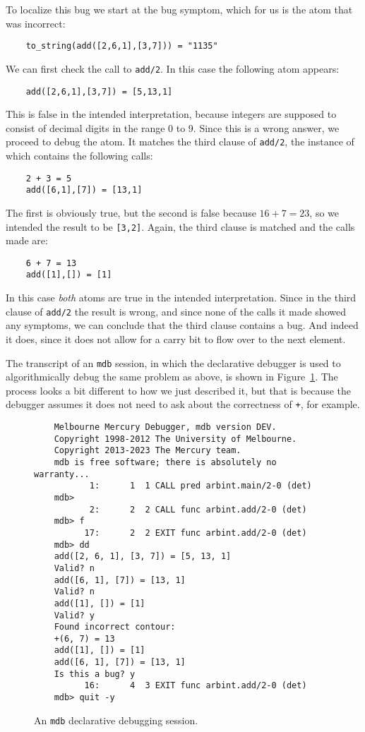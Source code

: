 To localize this bug we start at the bug symptom,
which for us is the atom that was incorrect:
\begin{verbatim}
    to_string(add([2,6,1],[3,7])) = "1135"
\end{verbatim}
We can first check the call to \texttt{add/2}.
In this case the following atom appears:
\begin{verbatim}
    add([2,6,1],[3,7]) = [5,13,1]
\end{verbatim}
This is false in the intended interpretation,
because integers are supposed to consist of decimal digits
in the range 0 to 9.
Since this is a wrong answer, we proceed to debug the atom.
It matches the third clause of \texttt{add/2},
the instance of which contains the following calls:
\begin{verbatim}
    2 + 3 = 5
    add([6,1],[7]) = [13,1]
\end{verbatim}
The first is obviously true,
but the second is false because $16 + 7 = 23$,
so we intended the result to be \texttt{[3,2]}.
Again, the third clause is matched and the calls made are:
\begin{verbatim}
    6 + 7 = 13
    add([1],[]) = [1]
\end{verbatim}
In this case \emph{both} atoms are true in the intended interpretation.
Since in the third clause of \texttt{add/2} the result is wrong,
and since none of the calls it made showed any symptoms,
we can conclude that the third clause contains a bug.
And indeed it does,
since it does not allow for a carry bit
to flow over to the next element.

The transcript of an \texttt{mdb} session,
in which the declarative debugger is used
to algorithmically debug the same problem as above,
is shown in Figure~\ref{fig:dd-session}.
The process looks a bit different to how we just described it,
but that is because the debugger assumes
it does not need to ask about the correctness of \texttt{+},
for example.

\begin{figure}
\begin{verbatim}
    Melbourne Mercury Debugger, mdb version DEV.
    Copyright 1998-2012 The University of Melbourne.
    Copyright 2013-2023 The Mercury team.
    mdb is free software; there is absolutely no warranty...
           1:      1  1 CALL pred arbint.main/2-0 (det)
    mdb>
           2:      2  2 CALL func arbint.add/2-0 (det)
    mdb> f
          17:      2  2 EXIT func arbint.add/2-0 (det)
    mdb> dd
    add([2, 6, 1], [3, 7]) = [5, 13, 1]
    Valid? n
    add([6, 1], [7]) = [13, 1]
    Valid? n
    add([1], []) = [1]
    Valid? y
    Found incorrect contour:
    +(6, 7) = 13
    add([1], []) = [1]
    add([6, 1], [7]) = [13, 1]
    Is this a bug? y
          16:      4  3 EXIT func arbint.add/2-0 (det)
    mdb> quit -y
\end{verbatim}
\caption{
An \texttt{mdb} declarative debugging session.
\label{fig:dd-session}}
\end{figure}


